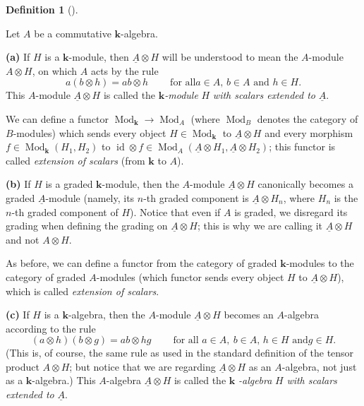 \documentclass[numbers=enddot,12pt,final,onecolumn,notitlepage,abstracton]{scrartcl}%
\theoremstyle{definition}
\newtheorem{defi}[theo]{Definition}
\newenvironment{definition}[1][]
{\begin{defi}[#1]\begin{leftbar}}
{\end{leftbar}\end{defi}}
\begin{document}
\begin{definition}
\label{def.extend-scalars}Let $A$ be a commutative $\mathbf{k}$-algebra.

\textbf{(a)} If $H$ is a $\mathbf{k}$-module, then $\underline{A}\otimes H$
will be understood to mean the $A$-module $A\otimes H$, on which $A$ acts by
the rule
\[
a\left(  b\otimes h\right)  =ab\otimes h\ \ \ \ \ \ \ \ \ \ \text{for all
}a\in A\text{, }b\in A\text{ and }h\in H.
\]
This $A$-module $\underline{A}\otimes H$ is called the $\mathbf{k}%
$\textit{-module }$H$\textit{ with scalars extended to }$\underline{A}$.

We can define a functor $\operatorname*{Mod}\nolimits_{\mathbf{k}}%
\rightarrow\operatorname*{Mod}\nolimits_{A}$ (where $\operatorname*{Mod}%
\nolimits_{B}$ denotes the category of $B$-modules) which sends every object
$H\in\operatorname*{Mod}\nolimits_{\mathbf{k}}$ to $\underline{A}\otimes H$
and every morphism $f\in\operatorname*{Mod}\nolimits_{\mathbf{k}}\left(
H_{1},H_{2}\right)  $ to $\operatorname*{id}\otimes f\in\operatorname*{Mod}%
\nolimits_{A}\left(  \underline{A}\otimes H_{1},\underline{A}\otimes
H_{2}\right)  $; this functor is called \textit{extension of scalars} (from
$\mathbf{k}$ to $A$).

\textbf{(b)} If $H$ is a graded $\mathbf{k}$-module, then the $A$-module
$\underline{A}\otimes H$ canonically becomes a graded $\underline{A}$-module
(namely, its $n$-th graded component is $\underline{A}\otimes H_{n}$, where
$H_{n}$ is the $n$-th graded component of $H$). Notice that even if $A$ is
graded, we disregard its grading when defining the grading on $\underline{A}%
\otimes H$; this is why we are calling it $\underline{A}\otimes H$ and not
$A\otimes H$.

As before, we can define a functor from the category of graded $\mathbf{k}%
$-modules to the category of graded $A$-modules (which functor sends every
object $H$ to $\underline{A}\otimes H$), which is called \textit{extension of
scalars}.

\textbf{(c)} If $H$ is a $\mathbf{k}$-algebra, then the $A$-module
$\underline{A}\otimes H$ becomes an $A$-algebra according to the rule%
\[
\left(  a\otimes h\right)  \left(  b\otimes g\right)  =ab\otimes
hg\ \ \ \ \ \ \ \ \ \ \text{for all }a\in A,\ b\in A\text{, }h\in H\text{ and
}g\in H.
\]
(This is, of course, the same rule as used in the standard definition of the
tensor product $A\otimes H$; but notice that we are regarding $\underline{A}%
\otimes H$ as an $A$-algebra, not just as a $\mathbf{k}$-algebra.) This
$A$-algebra $\underline{A}\otimes H$ is called the $\mathbf{k}$%
\textit{-algebra }$H$\textit{ with scalars extended to }$\underline{A}$.


\end{definition}
\end{document}
